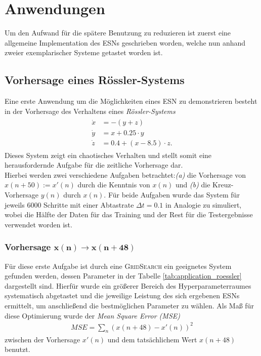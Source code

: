 \section{Anwendungen}
\label{chp:applications}
Um den Aufwand für die spätere Benutzung zu reduzieren ist zuerst eine allgemeine Implementation des \textsc{ESN}s geschrieben worden, welche nun anhand zweier exemplarischer Systeme getastet worden ist.

\subsection{Vorhersage eines Rössler-Systems}
Eine erste Anwendung um die Möglichkeiten eines \textsc{ESN} zu demonstrieren besteht in der Vorhersage des Verhaltens eines \textit{Rössler-Systems}
\begin{align}
\label{eq:application_roessler_pde}
\begin{split}
\dot{x} &= -(y+z)\\
\dot{y} &= x + 0.25 \cdot  y\\
\dot{z} &= 0.4 + (x - 8.5)\cdot z.
\end{split}
\end{align}
Dieses System zeigt ein chaotisches Verhalten und stellt somit eine herausfordernde Aufgabe für die zeitliche Vorhersage dar.\\
Hierbei werden zwei verschiedene Aufgaben betrachtet:\textit{(a)} die Vorhersage von $x(n+50) := x'(n)$ durch die Kenntnis von $x(n)$ und \textit{(b)} die Kreuz-Vorhersage $y(n)$ durch $x(n)$. Für beide Aufgaben wurde das System für jeweils $6000$ Schritte mit einer Abtastrate $\Delta t = 0.1$ in Analogie zu \cite{parlitz2005} simuliert, wobei die Hälfte der Daten für das Training und der Rest für die Testergebnisse verwendet worden ist.

\subsubsection[Vorhersage $x(n) \rightarrow x(n+48)$]{Vorhersage $\pmb{x(n) \rightarrow x(n+48)}$}
Für diese erste Aufgabe ist durch eine \textsc{GridSearch} ein geeignetes System gefunden werden, dessen Parameter in der Tabelle \ref{tab:application_roessler} dargestellt sind. Hierfür wurde ein größerer Bereich des Hyperparameterraumes systematisch abgetastet und die jeweilige Leistung des sich ergebenen \textsc{ESN}s ermittelt, um anschließend die bestmöglichen Parameter zu wählen. Als Maß für diese Optimierung wurde der \textit{Mean Square Error (MSE)}
\begin{align}
MSE = \sum_n \left(x(n+48) - x'(n) \right)^2
\end{align}
zwischen der Vorhersage $x'(n)$ und dem tatsächlichem Wert $x(n+48)$ benutzt.

